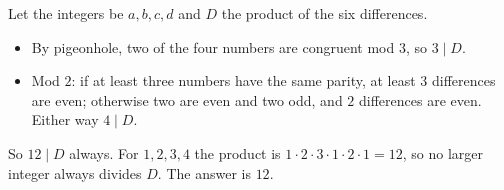 Let the integers be $a,b,c,d$ and $D$ the product of the six differences.
\begin{itemize}
\item By pigeonhole, two of the four numbers are congruent mod $3$, so $3\mid D$.
\item Mod $2$: if at least three numbers have the same parity, at least $3$ differences are even; otherwise two are even and two odd, and $2$ differences are even. Either way $4\mid D$.
\end{itemize}
So $12\mid D$ always. For $1,2,3,4$ the product is $1\cdot2\cdot3\cdot1\cdot2\cdot1=12$, so no larger integer always divides $D$. The answer is $\boxed{12}$.
